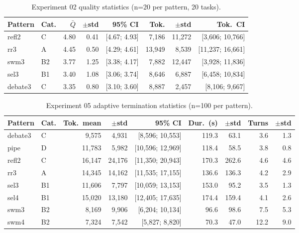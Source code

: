 \documentclass{article}
\begin{document}
\begin{table}[H]
\centering
\caption{Experiment 02 quality statistics (n=20 per pattern, 20 tasks).}
\label{tab:stats_exp02}
{\small
\begin{tabular}{@{}llrrrrrr@{}}
\toprule
\textbf{Pattern} & \textbf{Cat.} & $\bar{Q}$ & $\pm$\textbf{std} & \textbf{95\% CI} & \textbf{Tok.} & $\pm$\textbf{std} & \textbf{Tok.\ CI} \\
\midrule
refl2 & C & 4.80 & 0.41 & [4.67; 4.93] & 7,186 & 11,272 & [3,606; 10,766] \\
rr3 & A & 4.45 & 0.50 & [4.29; 4.61] & 13,949 & 8,539 & [11,237; 16,661] \\
swm3 & B2 & 3.77 & 1.25 & [3.38; 4.17] & 7,882 & 12,447 & [3,928; 11,836] \\
sel3 & B1 & 3.40 & 1.08 & [3.06; 3.74] & 8,646 & 6,887 & [6,458; 10,834] \\
debate3 & C & 3.35 & 0.80 & [3.10; 3.60] & 8,887 & 2,457 & [8,106; 9,667] \\
\bottomrule
\end{tabular}
}
\end{table}

\begin{table}[t]
\centering
\caption{Experiment 05 adaptive termination statistics (n=100 per pattern).}
\label{tab:stats_exp05}
{\small
\begin{tabular}{@{}llrrrrrrr@{}}
\toprule
\textbf{Pattern} & \textbf{Cat.} & \textbf{Tok.\ mean} & $\pm$\textbf{std} & \textbf{95\% CI} & \textbf{Dur.\ (s)} & $\pm$\textbf{std} & \textbf{Turns} & $\pm$\textbf{std} \\
\midrule
debate3 & C & 9,575 & 4,931 & [8,596; 10,553] & 119.3 & 63.1 & 3.6 & 1.3 \\
pipe & D & 11,783 & 5,982 & [10,596; 12,969] & 118.4 & 58.5 & 3.8 & 0.8 \\
refl2 & C & 16,147 & 24,176 & [11,350; 20,943] & 170.3 & 262.6 & 4.6 & 4.6 \\
rr3 & A & 14,345 & 14,162 & [11,535; 17,155] & 136.6 & 136.3 & 4.2 & 2.9 \\
sel3 & B1 & 11,606 & 7,797 & [10,059; 13,153] & 153.0 & 95.2 & 3.5 & 1.3 \\
sel4 & B1 & 15,020 & 13,180 & [12,405; 17,635] & 174.4 & 159.4 & 4.1 & 2.6 \\
swm3 & B2 & 8,169 & 9,906 & [6,204; 10,134] & 96.6 & 98.6 & 7.5 & 5.3 \\
swm4 & B2 & 7,324 & 7,542 & [5,827; 8,820] & 70.3 & 47.0 & 12.2 & 9.0 \\
\bottomrule
\end{tabular}
}
\end{table}
\end{document}
